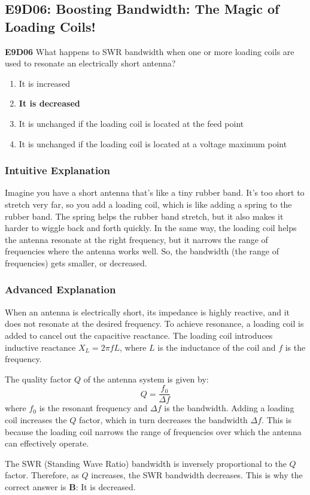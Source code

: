 \subsection{E9D06: Boosting Bandwidth: The Magic of Loading Coils!}

\begin{tcolorbox}[colback=gray!10!white,colframe=black!75!black,title=Question E9D06]
\textbf{E9D06} What happens to SWR bandwidth when one or more loading coils are used to resonate an electrically short antenna?
\begin{enumerate}[label=\Alph*.]
    \item It is increased
    \item \textbf{It is decreased}
    \item It is unchanged if the loading coil is located at the feed point
    \item It is unchanged if the loading coil is located at a voltage maximum point
\end{enumerate}
\end{tcolorbox}

\subsubsection*{Intuitive Explanation}
Imagine you have a short antenna that’s like a tiny rubber band. It’s too short to stretch very far, so you add a loading coil, which is like adding a spring to the rubber band. The spring helps the rubber band stretch, but it also makes it harder to wiggle back and forth quickly. In the same way, the loading coil helps the antenna resonate at the right frequency, but it narrows the range of frequencies where the antenna works well. So, the bandwidth (the range of frequencies) gets smaller, or decreased.

\subsubsection*{Advanced Explanation}
When an antenna is electrically short, its impedance is highly reactive, and it does not resonate at the desired frequency. To achieve resonance, a loading coil is added to cancel out the capacitive reactance. The loading coil introduces inductive reactance \(X_L = 2\pi f L\), where \(L\) is the inductance of the coil and \(f\) is the frequency. 

The quality factor \(Q\) of the antenna system is given by:
\[
Q = \frac{f_0}{\Delta f}
\]
where \(f_0\) is the resonant frequency and \(\Delta f\) is the bandwidth. Adding a loading coil increases the \(Q\) factor, which in turn decreases the bandwidth \(\Delta f\). This is because the loading coil narrows the range of frequencies over which the antenna can effectively operate.

The SWR (Standing Wave Ratio) bandwidth is inversely proportional to the \(Q\) factor. Therefore, as \(Q\) increases, the SWR bandwidth decreases. This is why the correct answer is \textbf{B}: It is decreased.

